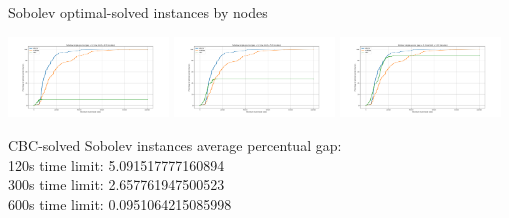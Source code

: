 \documentclass{article}
\begin{document}
	\begin{center}
		Sobolev optimal-solved instances by nodes
		
		\includegraphics[width=0.32\textwidth]{Sobolev SS 120 - Optimal x Nodes}
		\includegraphics[width=0.32\textwidth]{Sobolev SS 300 - Optimal x Nodes}
		\includegraphics[width=0.32\textwidth]{Sobolev SS 600 - Optimal x Nodes}
		
	\end{center}

	CBC-solved Sobolev instances average percentual gap:
\\	120s time limit:	5.091517777160894
\\	300s time limit:	2.657761947500523
\\	600s time limit: 	0.0951064215085998	

	
\end{document}
